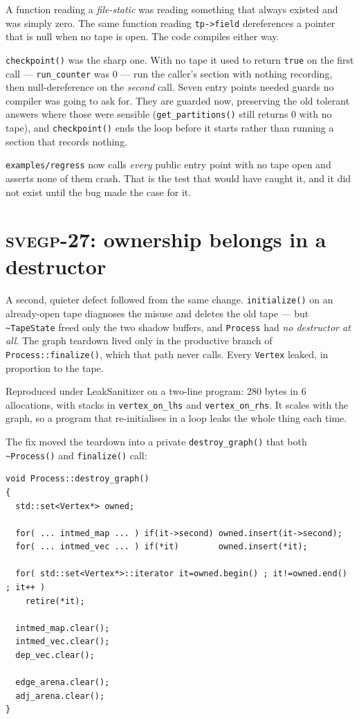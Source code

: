 \documentclass[11pt,a4paper]{report}
\newcommand{\svegp}[1]{\textsc{svegp-#1}}
\newcommand{\code}[1]{\texttt{#1}}
\begin{document}
A function reading a \emph{file-static} was reading something that always
existed and was simply zero. The same function reading \code{tp->field}
dereferences a pointer that is null when no tape is open. The code compiles
either way.

\code{checkpoint()} was the sharp one. With no tape it used to return
\code{true} on the first call --- \code{run\_counter} was 0 --- run the caller's
section with nothing recording, then null-dereference on the \emph{second} call.
Seven entry points needed guards no compiler was going to ask for. They are
guarded now, preserving the old tolerant answers where those were sensible
(\code{get\_partitions()} still returns 0 with no tape), and \code{checkpoint()}
ends the loop before it starts rather than running a section that records
nothing.

\code{examples/regress} now calls \emph{every} public entry point with no tape
open and asserts none of them crash. That is the test that would have caught it,
and it did not exist until the bug made the case for it.

\section{\svegp{27}: ownership belongs in a destructor}

A second, quieter defect followed from the same change. \code{initialize()} on
an already-open tape diagnoses the misuse and deletes the old tape --- but
\code{\textasciitilde TapeState} freed only the two shadow buffers, and
\code{Process} had \emph{no destructor at all}. The graph teardown lived only in
the productive branch of \code{Process::finalize()}, which that path never
calls. Every \code{Vertex} leaked, in proportion to the tape.

Reproduced under LeakSanitizer on a two-line program: 280 bytes in 6
allocations, with stacks in \code{vertex\_on\_lhs} and \code{vertex\_on\_rhs}.
It scales with the graph, so a program that re-initialises in a loop leaks the
whole thing each time.

The fix moved the teardown into a private \code{destroy\_graph()} that both
\code{\textasciitilde Process()} and \code{finalize()} call:

\begin{lstlisting}
void Process::destroy_graph()
{
  std::set<Vertex*> owned;

  for( ... intmed_map ... ) if(it->second) owned.insert(it->second);
  for( ... intmed_vec ... ) if(*it)        owned.insert(*it);

  for( std::set<Vertex*>::iterator it=owned.begin() ; it!=owned.end() ; it++ )
    retire(*it);

  intmed_map.clear();
  intmed_vec.clear();
  dep_vec.clear();

  edge_arena.clear();
  adj_arena.clear();
}
\end{lstlisting}
\end{document}
